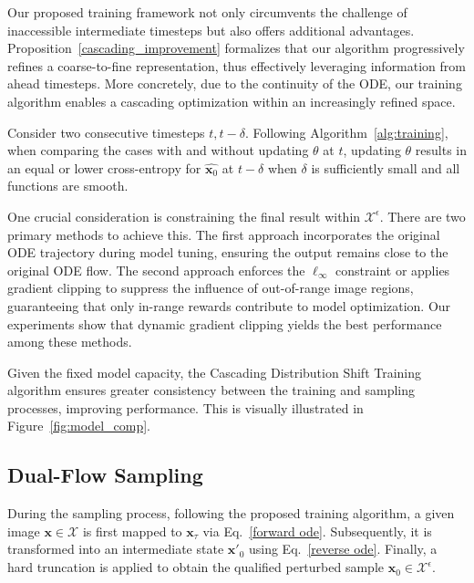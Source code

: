 Our proposed training framework not only circumvents the challenge of inaccessible intermediate timesteps but also offers additional advantages. Proposition~\ref{cascading_improvement} formalizes that our algorithm progressively refines a coarse-to-fine representation, thus effectively leveraging information from ahead timesteps.
More concretely, due to the continuity of the ODE, our training algorithm enables a cascading optimization within an increasingly refined space. 

\begin{proposition}
\label{cascading_improvement}

Consider two consecutive timesteps  $t, t - \delta$. Following Algorithm~\ref{alg:training}, when comparing the cases with and without updating  $\theta$  at  $t$, updating  $\theta$  results in an equal or lower cross-entropy for  $\widehat{\mathbf{x}_0}$ at $t-\delta$ when  $\delta$  is sufficiently small and all functions are smooth.
\end{proposition}

One crucial consideration is constraining the final result within $\mathcal{X}^\epsilon$. There are two primary methods to achieve this. The first approach incorporates the original ODE trajectory during model tuning, ensuring the output remains close to the original ODE flow. The second approach enforces the $\ell_\infty$ constraint or applies gradient clipping to suppress the influence of out-of-range image regions, guaranteeing that only in-range rewards contribute to model optimization. Our experiments show that dynamic gradient clipping yields the best performance among these methods.


Given the fixed model capacity, the Cascading Distribution Shift Training algorithm ensures greater consistency between the training and sampling processes, improving performance. This is visually illustrated in Figure~\ref{fig:model_comp}.

\subsection{Dual-Flow Sampling}

During the sampling process, following the proposed training algorithm, a given image $\mathbf{x} \in \mathcal{X}$ is first mapped to $\mathbf{x}_\tau$ via Eq.~\eqref{forward ode}. Subsequently, it is transformed into an intermediate state $\mathbf{x}'_{0}$ using Eq.~\eqref{reverse ode}. Finally, a hard truncation is applied to obtain the qualified perturbed sample $\mathbf{x}_0 \in \mathcal{X}^\epsilon$.

